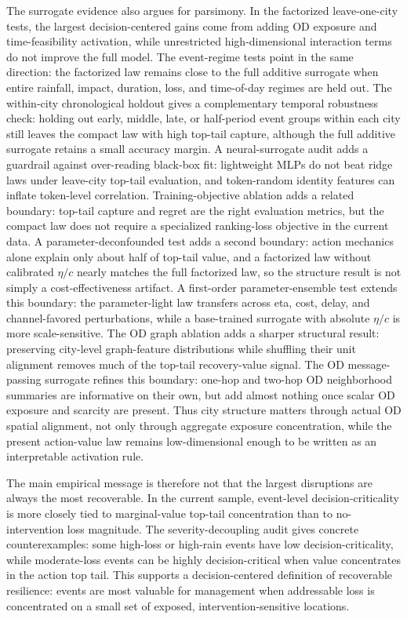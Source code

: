 The surrogate evidence also argues for parsimony. In the factorized leave-one-city tests, the largest decision-centered gains come from adding OD exposure and time-feasibility activation, while unrestricted high-dimensional interaction terms do not improve the full model. The event-regime tests point in the same direction: the factorized law remains close to the full additive surrogate when entire rainfall, impact, duration, loss, and time-of-day regimes are held out. The within-city chronological holdout gives a complementary temporal robustness check: holding out early, middle, late, or half-period event groups within each city still leaves the compact law with high top-tail capture, although the full additive surrogate retains a small accuracy margin. A neural-surrogate audit adds a guardrail against over-reading black-box fit: lightweight MLPs do not beat ridge laws under leave-city top-tail evaluation, and token-random identity features can inflate token-level correlation. Training-objective ablation adds a related boundary: top-tail capture and regret are the right evaluation metrics, but the compact law does not require a specialized ranking-loss objective in the current data. A parameter-deconfounded test adds a second boundary: action mechanics alone explain only about half of top-tail value, and a factorized law without calibrated \(\eta/c\) nearly matches the full factorized law, so the structure result is not simply a cost-effectiveness artifact. A first-order parameter-ensemble test extends this boundary: the parameter-light law transfers across eta, cost, delay, and channel-favored perturbations, while a base-trained surrogate with absolute \(\eta/c\) is more scale-sensitive. The OD graph ablation adds a sharper structural result: preserving city-level graph-feature distributions while shuffling their unit alignment removes much of the top-tail recovery-value signal. The OD message-passing surrogate refines this boundary: one-hop and two-hop OD neighborhood summaries are informative on their own, but add almost nothing once scalar OD exposure and scarcity are present. Thus city structure matters through actual OD spatial alignment, not only through aggregate exposure concentration, while the present action-value law remains low-dimensional enough to be written as an interpretable activation rule.

The main empirical message is therefore not that the largest disruptions are always the most recoverable. In the current sample, event-level decision-criticality is more closely tied to marginal-value top-tail concentration than to no-intervention loss magnitude. The severity-decoupling audit gives concrete counterexamples: some high-loss or high-rain events have low decision-criticality, while moderate-loss events can be highly decision-critical when value concentrates in the action top tail. This supports a decision-centered definition of recoverable resilience: events are most valuable for management when addressable loss is concentrated on a small set of exposed, intervention-sensitive locations.

